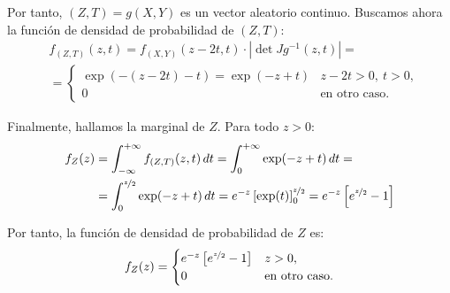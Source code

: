 \begin{ejercicio}
    Por tanto, $(Z,T)=g(X,Y)$ es un vector aleatorio continuo. Buscamos ahora la función de densidad de probabilidad de $(Z,T)$:
    \begin{align*}
        &f_{(Z,T)}(z, t)=f_{(X,Y)}(z-2t,t)\cdot \left|\det Jg^{-1}(z,t)\right|
        =\\&= \begin{cases}
            \exp(-(z-2t)-t)=\exp(-z+t) & z-2t>0,~t>0, \\
            0 & \text{en otro caso}.
        \end{cases}
    \end{align*}

    Finalmente, hallamos la marginal de $Z$. Para todo $z>0$:
    \begin{align*}
        f_Z(z)&=\int_{-\infty}^{+\infty} f_{(Z,T)}(z, t) \, dt = \int_{0}^{+\infty} \exp(-z+t) \, dt
        =\\&= \int_{0}^{\nicefrac{z}{2}} \exp(-z+t) \, dt = e^{-z}\left[\exp(t)\right]_0^{\nicefrac{z}{2}} = e^{-z}\left[e^{\nicefrac{z}{2}}-1\right]
    \end{align*}

    Por tanto, la función de densidad de probabilidad de $Z$ es:
    \begin{equation*}
        f_Z(z) = \begin{cases}
            e^{-z}\left[e^{\nicefrac{z}{2}}-1\right] & z>0, \\
            0 & \text{en otro caso}.
        \end{cases}
    \end{equation*}

\end{ejercicio}

